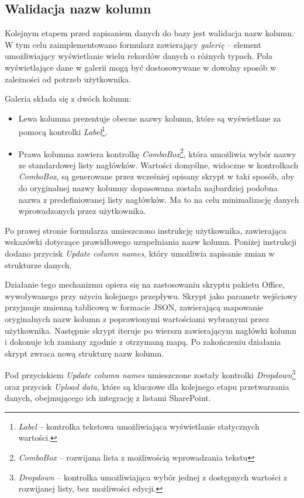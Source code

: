 \subsection{Walidacja nazw kolumn} Kolejnym etapem przed zapisaniem danych do bazy jest walidacja nazw kolumn. W tym celu zaimplementowano formularz zawierający \emph{galerię} -- element umożliwiający wyświetlanie wielu rekordów danych o różnych typach. Pola wyświetlające dane w galerii mogą być dostosowywane w dowolny sposób w zależności od potrzeb użytkownika.

\noindent Galeria składa się z dwóch kolumn:
\begin{itemize}
    \item Lewa kolumna prezentuje obecne nazwy kolumn, które są wyświetlane za pomocą kontrolki \emph{Label}\footnote{\emph{Label} -- kontrolka tekstowa umożliwiająca wyświetlanie statycznych wartości.}.
    \item Prawa kolumna zawiera kontrolkę \emph{ComboBox}\footnote{\emph{ComboBox} -- rozwijana lista z możliwością wprowadzania tekstu}, która umożliwia wybór nazwy ze standardowej listy nagłówków. Wartości domyślne, widoczne w kontrolkach \emph{ComboBox}, są generowane przez wcześniej opisany skrypt w taki sposób, aby do oryginalnej nazwy kolumny dopasowana została najbardziej podobna nazwa z predefiniowanej listy nagłówków. Ma to na celu minimalizację danych wprowadzonych przez użytkownika.
\end{itemize}

Po prawej stronie formularza umieszczono instrukcję użytkownika, zawierająca wskazówki dotyczące prawidłowego uzupełniania nazw kolumn. Poniżej instrukcji dodano przycisk \emph{Update column names}, który umożliwia zapisanie zmian w strukturze danych.

\noindent Działanie tego mechanizmu opiera się na zastosowaniu skryptu pakietu Office, wywoływanego przy użyciu kolejnego przepływu. Skrypt jako parametr wejściowy przyjmuje zmienną tablicową w formacie JSON, zawierającą mapowanie oryginalnych nazw kolumn z poprawionymi wartościami wybranymi przez użytkownika. Następnie skrypt iteruje po wierszu zawierającym nagłówki kolumn i dokonuje ich zamiany zgodnie z otrzymaną mapą. Po zakończeniu działania skrypt zwraca nową strukturę nazw kolumn.

Pod przyciskiem \emph{Update column names} umieszczone zostały kontrolki \emph{Dropdown}\footnote{\emph{Dropdown} -- kontrolka umożliwiająca wybór jednej z dostępnych wartości z rozwijanej listy, bez możliwości edycji.} oraz przycisk \emph{Upload data}, które są kluczowe dla kolejnego etapu przetwarzania danych, obejmującego ich integrację z listami SharePoint.


